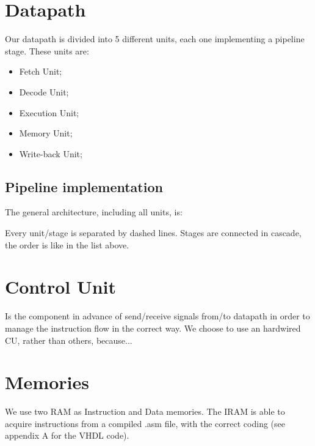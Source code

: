 \FloatBarrier

\section{Datapath}

Our datapath is divided into 5 different units, each one implementing a pipeline stage. These units are:

\begin{itemize}
\item Fetch Unit;
\item Decode Unit;
\item Execution Unit;
\item Memory Unit;
\item Write-back Unit;
\end{itemize}


\subsection{Pipeline implementation}

The general architecture, including all units, is:


Every unit/stage is separated by dashed lines. Stages are connected in cascade, the order is like in the list above. 

\section{Control Unit}

Is the component in advance of send/receive signals from/to datapath in order to manage the instruction flow in the
correct way. We choose to use an hardwired CU, rather than others, because...

\section{Memories}                                      
 We use two RAM as Instruction and Data memories. The IRAM is able to acquire instructions from a compiled .asm file, 
 with the correct coding (see appendix A for the VHDL code).                                            